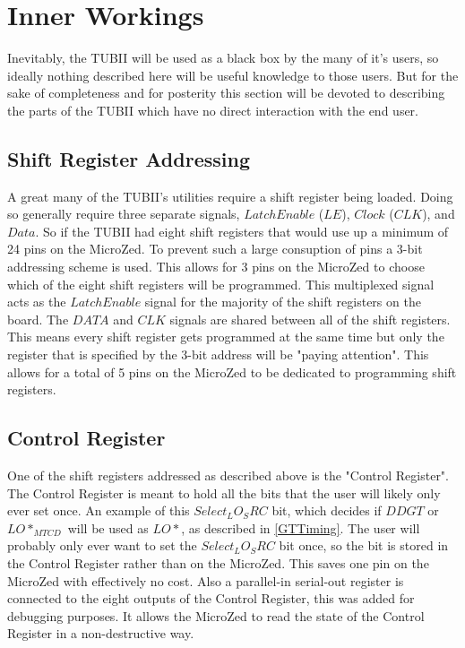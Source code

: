 \documentclass[11pt,a4paper]{article}
\begin{document}
\section{Inner Workings}
Inevitably, the TUBII will be used as a black box by the many of it's users, so ideally nothing described here will be useful knowledge to those users. But for the sake of completeness and for posterity this section will be devoted to describing the parts of the TUBII which have no direct interaction with the end user.

\subsection{Shift Register Addressing}
A great many of the TUBII's utilities require a shift register being loaded. Doing so generally require three separate signals, $Latch Enable$ ($LE$), $Clock$ ($CLK$), and $Data$.
So if the TUBII had eight shift registers that would use up a minimum of 24 pins on the MicroZed. To prevent such a large consuption of pins a 3-bit addressing scheme is used. This allows for 3 pins on the MicroZed to choose which of the eight shift registers will be programmed. This multiplexed signal acts as the $LatchEnable$ signal for the majority of the shift registers on the board. The $DATA$ and $CLK$ signals are shared between all of the shift registers. This means every shift register gets programmed at the same time but only the register that is specified by the 3-bit address will be "paying attention". This allows for a total of 5 pins on the MicroZed to be dedicated to programming shift registers.
\subsection{Control Register}
One of the shift registers addressed as described above is the "Control Register". The Control Register is meant to hold all the bits that the user will likely only ever set once. An example of this $Select_LO_SRC$ bit, which decides if $DDGT$ or $LO*_{MTCD}$ will be used as $LO*$, as described in \ref{GTTiming}. The user will probably only ever want to set the $Select_LO_SRC$ bit once, so the bit is stored in the Control Register rather than on the MicroZed. This saves one pin on the MicroZed with effectively no cost. Also a parallel-in serial-out register is connected to the eight outputs of the Control Register, this was added for debugging purposes. It allows the MicroZed to read the state of the Control Register in a non-destructive way. 
\end{document}
